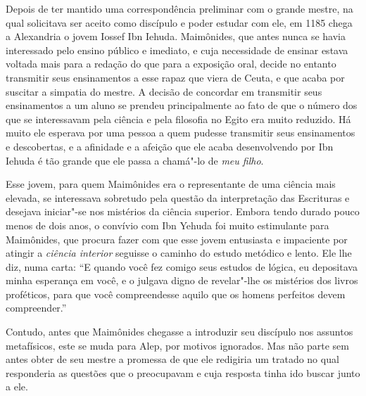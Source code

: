 Depois de ter mantido uma correspondência preliminar com o grande
mestre, na qual solicitava ser aceito como discípulo e poder estudar com
ele, em 1185 chega a Alexandria o jovem Iossef Ibn Iehuda. Maimônides,
que antes nunca se havia interessado pelo ensino público e imediato, e
cuja necessidade de ensinar estava voltada mais para a redação do que
para a exposição oral, decide no entanto transmitir seus ensinamentos a
esse rapaz que viera de Ceuta, e que acaba por suscitar a simpatia do
mestre. A decisão de concordar em transmitir seus ensinamentos a um
aluno se prendeu principalmente ao fato de que o número dos que se
interessavam pela ciência e pela filosofia no Egito era muito reduzido.
Há muito ele esperava por uma pessoa a quem pudesse transmitir seus
ensinamentos e descobertas, e a afinidade e a afeição que ele acaba
desenvolvendo por Ibn Iehuda é tão grande que ele passa a chamá"-lo de
\emph{meu filho}.

Esse jovem, para quem Maimônides era o representante de uma ciência mais
elevada, se interessava sobretudo pela questão da interpretação das
Escrituras e desejava iniciar"-se nos mistérios da ciência superior.
Embora tendo durado pouco menos de dois anos, o convívio com Ibn Yehuda
foi muito estimulante para Maimônides, que procura fazer com que esse
jovem entusiasta e impaciente por atingir a \emph{ciência interior}
seguisse o caminho do estudo metódico e lento. Ele lhe diz, numa carta:
``E quando você fez comigo seus estudos de lógica, eu depositava minha
esperança em você, e o julgava digno de revelar"-lhe os mistérios dos
livros proféticos, para que você compreendesse aquilo que os homens
perfeitos devem compreender.''

Contudo, antes que Maimônides chegasse a introduzir seu discípulo nos
assuntos metafísicos, este se muda para Alep, por motivos ignorados. Mas
não parte sem antes obter de seu mestre a promessa de que ele redigiria
um tratado no qual responderia as questões que o preocupavam e cuja
resposta tinha ido buscar junto a ele.

